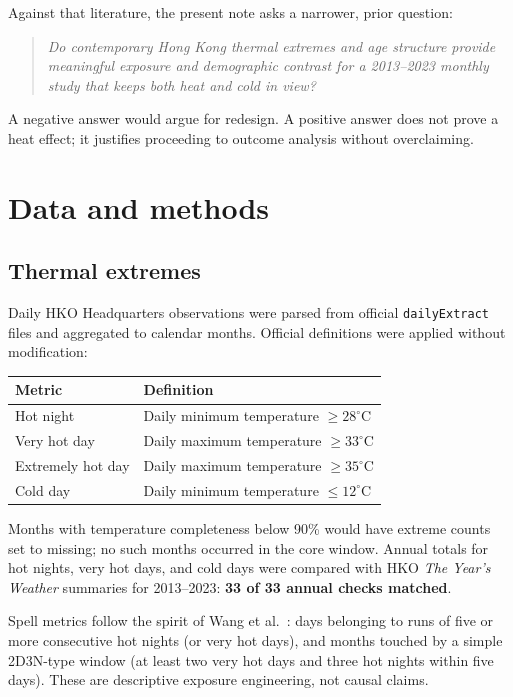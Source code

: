 \documentclass[11pt]{article}
\begin{document}
Against that literature, the present note asks a narrower, prior question:

\begin{quote}
\textit{Do contemporary Hong Kong thermal extremes and age structure provide meaningful
exposure and demographic contrast for a 2013--2023 monthly study that keeps both heat and
cold in view?}
\end{quote}

A negative answer would argue for redesign. A positive answer does not prove a heat effect;
it justifies proceeding to outcome analysis without overclaiming.

\section{Data and methods}

\subsection{Thermal extremes}

Daily HKO Headquarters observations were parsed from official \texttt{dailyExtract} files and
aggregated to calendar months. Official definitions were applied without modification:

\begin{center}
\begin{tabular}{@{}ll@{}}
\toprule
Metric & Definition \\
\midrule
Hot night & Daily minimum temperature $\ge 28^\circ$C \\
Very hot day & Daily maximum temperature $\ge 33^\circ$C \\
Extremely hot day & Daily maximum temperature $\ge 35^\circ$C \\
Cold day & Daily minimum temperature $\le 12^\circ$C \\
\bottomrule
\end{tabular}
\end{center}

Months with temperature completeness below 90\% would have extreme counts set to missing;
no such months occurred in the core window. Annual totals for hot nights, very hot days, and
cold days were compared with HKO \textit{The Year's Weather} summaries for 2013--2023:
\textbf{33 of 33 annual checks matched}.

Spell metrics follow the spirit of Wang et al.\ \citep{wang2019}: days belonging to runs of
five or more consecutive hot nights (or very hot days), and months touched by a simple
2D3N-type window (at least two very hot days and three hot nights within five days). These
are descriptive exposure engineering, not causal claims.
\end{document}
